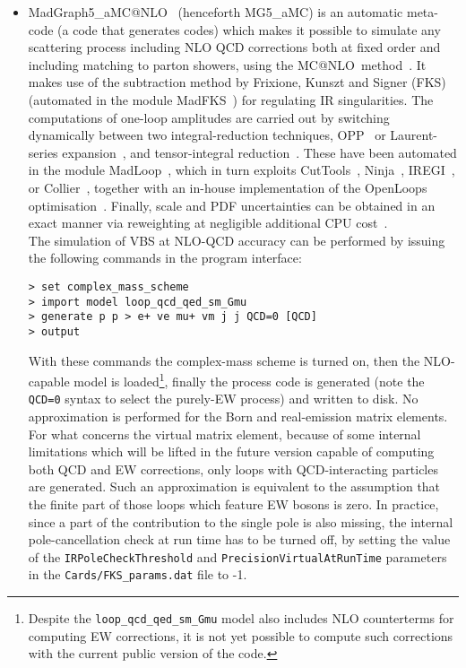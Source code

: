 \begin{itemize}
  \item {\sc MadGraph5\_aMC@NLO}~\cite{Alwall:2014hca} (henceforth {\sc MG5\_aMC}) is an automatic meta-code (a code that generates codes) which makes it possible to simulate any scattering process
      including NLO QCD corrections both at fixed order and including matching to parton showers, using the {\sc MC@NLO}\ method~\cite{Frixione:2002ik}. It makes use of the subtraction method by Frixione, Kunszt and Signer (FKS)~\cite{Frixione:1995ms,
        Frixione:1997np} (automated in the module {\sc MadFKS}~\cite{Frederix:2009yq,
        Frederix:2016rdc}) for regulating IR singularities. The computations of one-loop amplitudes are carried out by switching dynamically between
        two integral-reduction techniques, OPP~\cite{Ossola:2006us} or Laurent-series expansion~\cite{Mastrolia:2012bu},
        and tensor-integral reduction~\cite{Passarino:1978jh,Davydychev:1991va,Denner:2005nn}. These have been automated in the module {\sc MadLoop}~\cite{Hirschi:2011pa}, which
        in turn exploits {\sc CutTools}~\cite{Ossola:2007ax}, {\sc Ninja}~\cite{Peraro:2014cba,
        Hirschi:2016mdz}, {\sc IREGI}~\cite{ShaoIREGI}, or {\sc Collier}~\cite{Denner:2016kdg}, together with an in-house 
        implementation of the {\sc OpenLoops} optimisation~\cite{Cascioli:2011va}. Finally, scale and PDF uncertainties can be obtained in an exact manner via reweighting
        at negligible additional CPU cost~\cite{Frederix:2011ss}.\\
        The simulation of VBS at NLO-QCD accuracy can be performed by issuing the following commands in the program interface:
\begin{verbatim}
> set complex_mass_scheme
> import model loop_qcd_qed_sm_Gmu
> generate p p > e+ ve mu+ vm j j QCD=0 [QCD]
> output
\end{verbatim}
  With these commands the complex-mass scheme is turned on, then the NLO-capable model is loaded\footnote{Despite
            the {\tt loop\_qcd\_qed\_sm\_Gmu} model also includes NLO counterterms for computing EW corrections, it is not yet possible to compute such corrections
        with the current public version of the code.}, finally the process code is generated (note the {\tt QCD=0} syntax to select the purely-EW process)
        and written to disk. No approximation is performed for the Born and real-emission matrix elements. 
        For what concerns the virtual matrix element, because of some internal limitations which will be lifted in the future version capable of computing both QCD and EW corrections,
        only loops with QCD-interacting particles are generated. Such an approximation is equivalent to the assumption that the finite part of
        those loops which feature EW bosons is zero. In practice, since a part of the contribution to the single pole is also missing, the internal 
        pole-cancellation check at run time has to be turned off, by setting the value of the {\tt IR\-Pole\-Check\-Threshold} and 
        {\tt Precision\-Virtual\-At\-Run\-Time} parameters in the {\tt Cards\-/FKS\_\-params.dat} file to -1.


\end{itemize}
